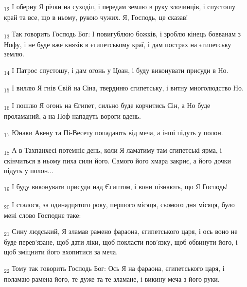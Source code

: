 \begin{tcolorbox}
\textsubscript{12} І оберну Я річки на суходіл, і передам землю в руку злочинців, і спустошу край та все, що в ньому, рукою чужих. Я, Господь, це сказав!
\end{tcolorbox}
\begin{tcolorbox}
\textsubscript{13} Так говорить Господь Бог: І повигублюю божків, і зроблю кінець бовванам з Нофу, і не буде вже князів в єгипетському краї, і дам пострах на єгипетську землю.
\end{tcolorbox}
\begin{tcolorbox}
\textsubscript{14} І Патрос спустошу, і дам огонь у Цоан, і буду виконувати присуди в Но.
\end{tcolorbox}
\begin{tcolorbox}
\textsubscript{15} І виллю Я гнів Свій на Сіна, твердиню єгипетську, і витну многолюдство Но.
\end{tcolorbox}
\begin{tcolorbox}
\textsubscript{16} І пошлю Я огонь на Єгипет, сильно буде корчитись Сін, а Но буде проламаний, а на Ноф нападуть вороги вдень.
\end{tcolorbox}
\begin{tcolorbox}
\textsubscript{17} Юнаки Авену та Пі-Весету попадають від меча, а інші підуть у полон.
\end{tcolorbox}
\begin{tcolorbox}
\textsubscript{18} А в Тахпанхесі потемніє день, коли Я ламатиму там єгипетські ярма, і скінчиться в ньому пиха сили його. Самого його хмара закриє, а його дочки підуть у полон...
\end{tcolorbox}
\begin{tcolorbox}
\textsubscript{19} І буду виконувати присуди над Єгиптом, і вони пізнають, що Я Господь!
\end{tcolorbox}
\begin{tcolorbox}
\textsubscript{20} І сталося, за одинадцятого року, першого місяця, сьомого дня місяця, було мені слово Господнє таке:
\end{tcolorbox}
\begin{tcolorbox}
\textsubscript{21} Сину людський, Я зламав рамено фараона, єгипетського царя, і ось воно не буде перев'язане, щоб дати ліки, щоб покласти пов'язку, щоб обвинути його, і щоб зміцнити його вхопитися за меча.
\end{tcolorbox}
\begin{tcolorbox}
\textsubscript{22} Тому так говорить Господь Бог: Ось Я на фараона, єгипетського царя, і поламаю рамена його, те дуже та те зламане, і викину меча з його руки.
\end{tcolorbox}
